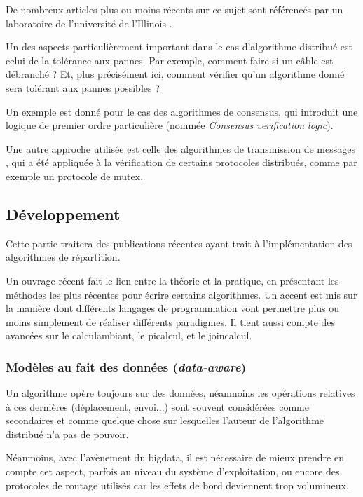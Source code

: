 De nombreux articles plus ou moins récents sur ce sujet sont référencés par un laboratoire de l'université de l'Illinois \cite{formaldistributed}.

Un des aspects particulièrement important dans le cas d'algorithme distribué est celui de la tolérance aux pannes. Par exemple, comment faire si un câble est débranché ? Et, plus précisément ici, comment vérifier qu'un algorithme donné sera tolérant aux pannes possibles ? 

Un exemple est donné \cite{mcmillan2014verification} pour le cas des algorithmes de consensus, qui introduit une logique de premier ordre particulière (nommée \textit{Consensus verification logic}).

Une autre approche utilisée est celle des algorithmes de transmission de messages \cite{jezequel2014message}, qui a été appliquée à la vérification de certains protocoles distribués, comme par exemple un protocole de \gls{mutex}.

\subsection{Développement}
Cette partie traitera des publications récentes ayant trait à l'implémentation des algorithmes de répartition.

Un ouvrage récent \cite{varela2013programming} fait le lien entre la théorie et la pratique, en présentant les méthodes les plus récentes pour écrire certains algorithmes. Un accent est mis sur la manière dont différents langages de programmation vont permettre plus ou moins simplement de réaliser différents paradigmes. Il tient aussi compte des avancées sur le \gls{calculambiant}, le \gls{picalcul}, et le \gls{joincalcul}.

\subsubsection{Modèles au fait des données (\textit{data-aware})}
Un algorithme opère toujours sur des données, néanmoins les opérations relatives à ces dernières (déplacement, envoi...) sont souvent considérées comme secondaires et comme quelque chose sur lesquelles l'auteur de l'algorithme distribué n'a pas de pouvoir.

Néanmoins, avec l'avènement du \gls{bigdata}, il est nécessaire de mieux prendre en compte cet aspect, parfois au niveau du système d'exploitation, ou encore des protocoles de routage utilisés \cite{baehni2004dependable} car les effets de bord deviennent trop volumineux.

